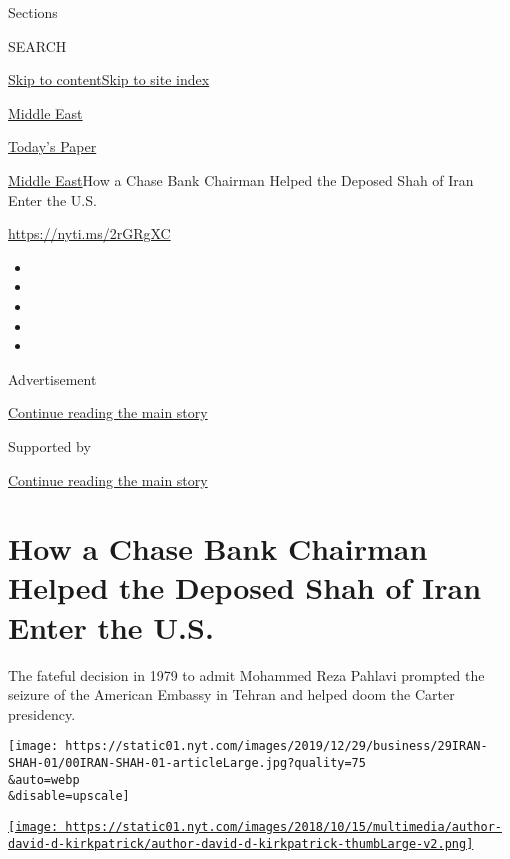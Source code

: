 Sections

SEARCH

\protect\hyperlink{site-content}{Skip to
content}\protect\hyperlink{site-index}{Skip to site index}

\href{https://www.nytimes.com/section/world/middleeast}{Middle East}

\href{https://myaccount.nytimes.com/auth/login?response_type=cookie\&client_id=vi}{}

\href{https://www.nytimes.com/section/todayspaper}{Today's Paper}

\href{/section/world/middleeast}{Middle East}\textbar{}How a Chase Bank
Chairman Helped the Deposed Shah of Iran Enter the U.S.

\href{https://nyti.ms/2rGRgXC}{https://nyti.ms/2rGRgXC}

\begin{itemize}
\item
\item
\item
\item
\item
\end{itemize}

Advertisement

\protect\hyperlink{after-top}{Continue reading the main story}

Supported by

\protect\hyperlink{after-sponsor}{Continue reading the main story}

\hypertarget{how-a-chase-bank-chairman-helped-the-deposed-shah-of-iran-enter-the-us}{%
\section{How a Chase Bank Chairman Helped the Deposed Shah of Iran Enter
the
U.S.}\label{how-a-chase-bank-chairman-helped-the-deposed-shah-of-iran-enter-the-us}}

The fateful decision in 1979 to admit Mohammed Reza Pahlavi prompted the
seizure of the American Embassy in Tehran and helped doom the Carter
presidency.

\texttt{[image: https://static01.nyt.com/images/2019/12/29/business/29IRAN-SHAH-01/00IRAN-SHAH-01-articleLarge.jpg?quality=75\\\&auto=webp\\\&disable=upscale]}

\href{https://www.nytimes.com/by/david-d-kirkpatrick}{\texttt{[image: https://static01.nyt.com/images/2018/10/15/multimedia/author-david-d-kirkpatrick/author-david-d-kirkpatrick-thumbLarge-v2.png]}}

